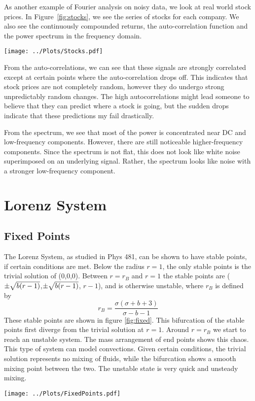 \documentclass[twocolumn]{myarticle}
\begin{document}
As another example of Fourier analysis on noisy data, we look at real world stock prices.
In Figure~\ref{fig:stocks}, we see the series of stocks for each company.
We also see the continuously compounded returns, the auto-correlation function and the power spectrum in the frequency domain.

\begin{figure*}[htb]
    \centering
    \texttt{[image: ../Plots/Stocks.pdf]}
    \caption{Analysis of real world stock prices.}
    \label{fig:stocks}
\end{figure*}

From the auto-correlations, we can see that these signals are strongly correlated except at certain points where the auto-correlation drops off.
This indicates that stock prices are not completely random, however they do undergo strong unpredictably random changes.
The high autocorrelations might lead someone to believe that they can predict where a stock is going, but the sudden drops indicate that these predictions my fail drastically.

From the spectrum, we see that most of the power is concentrated near DC and low-frequency components.
However, there are still noticeable higher-frequency components.
Since the spectrum is not flat, this does not look like white noise superimposed on an underlying signal.
Rather, the spectrum looks like noise with a stronger low-frequency component.

\section{Lorenz System}
\subsection{Fixed Points}
The Lorenz System, as studied in Phys 481, can be shown to have stable points, if certain conditions are met. Below the radius $r=1$, the only stable points is the trivial solution of (0,0,0). Between $r=r_{B}$ and $r=1$ the stable points are ($\pm \sqrtsign{b(r-1)}$,$\pm \sqrtsign{b(r-1)}$, $r-1$), and is otherwise unstable, where $r_{B}$ is defined by
\begin{equation*}
r_{B} = \frac{\sigma (\sigma + b + 3)}{\sigma - b -1}
\end{equation*}
These stable points are shown in figure \ref{fig:fixed}. This bifurcation of the stable points first diverge from the trivial solution at $r=1$. Around $r=r_{B}$ we start to reach an unstable system. The mass arrangement of end points shows this chaos. This type of system can model convections. Given certain conditions, the trivial solution represents no mixing of fluids, while the bifurcation shows a smooth mixing point between the two. The unstable state is very quick and unsteady mixing.
\begin{figure*}[htb]
    \centering
    \texttt{[image: ../Plots/FixedPoints.pdf]}
    \caption{Bifurcation Diagram for the Lorenz System.}
    \label{fig:fixed}
\end{figure*}
\end{document}
